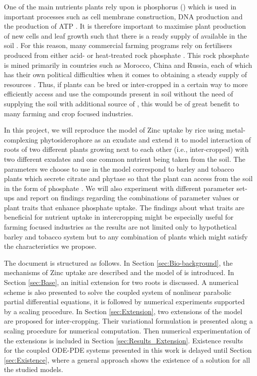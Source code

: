 \documentclass[11pt]{article}
\numberwithin{equation}{section}
\begin{document}
One of the main nutrients plants rely upon is phosphorus () which is used in important processes such as cell membrane construction, DNA production and the production of ATP \cite{vysotskaya_2016}. It is therefore important to maximise plant production of new cells and leaf growth such that there is a ready supply of  available in the soil \cite{vysotskaya_2016}. For this reason, many commercial farming programs rely on  fertilisers produced from either acid- or heat-treated rock phosphate \cite{PhosporusRecoveryandRecycling}. This rock phosphate is mined primarily in countries such as Morocco, China and Russia, each of which has their own political difficulties when it comes to obtaining a steady supply of resources \cite{fact.mr_2021}. Thus, if plants can be bred or inter-cropped in a certain way to more efficiently access and use the  compounds present in soil without the need of supplying the soil with additional source of , this would be of great benefit to many farming and crop focused industries.

In this project, we will reproduce the model of Zinc uptake by rice using metal-complexing phytosidero\-phore as an exudate \cite{Ptashnyk-2011} and extend it to model interaction of roots of two different plants growing next to each other (i.e., inter-cropped) with two different exudates and one common nutrient being taken from the soil. The parameters we choose to use in the model correspond to barley and tobacco plants which secrete citrate and phytase so that the plant can access  from the soil in the form of phosphate \cite{giles_richardson2018}. We will also experiment with different parameter set-ups and report on findings regarding the combinations of parameter values or plant traits that enhance phosphate uptake. The findings about what traits are beneficial for nutrient uptake in intercropping might be especially useful for farming focused industries as the results are not limited only to hypothetical barley and tobacco system but to any combination of plants which might satisfy the characteristics we propose. 

The document is structured as follows. In Section \ref{sec:Bio-background}, the mechanisms of Zinc uptake are described and the model of \cite{Ptashnyk-2011} is introduced. 
In Section \ref{sec:Base}, an initial extension for two roots is discussed. A numerical scheme is also presented to solve the coupled system of nonlinear parabolic partial differential equations, it is followed by numerical experiments supported by a scaling procedure. In Section \ref{sec:Extension}, two extensions of the model are proposed for inter-cropping. Their variational formulation is presented along a scaling procedure for numerical computation. Then numerical experimentation of the extensions is included in Section \ref{sec:Results_Extension}. Existence results for the coupled ODE-PDE systems presented in this work is delayed until Section \ref{sec:Existence}, where a general approach shows the existence of a solution for all the studied models.
\end{document}
